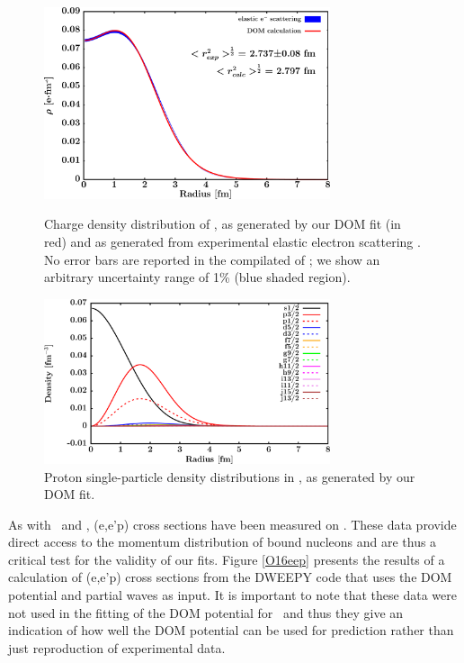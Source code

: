 \begin{figure}[tb]
    \centering
    \includegraphics[width=0.75\textwidth]{figures/o16_chargeDensity.png}
    \caption[Proton single-particle density distributions in \oSix]
    {
        Charge density distribution of \oSix, as generated
        by our DOM fit (in red) and as generated from experimental
        elastic electron scattering \cite{DeVries1987}. No error bars are
        reported in the compilated of \cite{DeVries1987}; we show an
        arbitrary uncertainty range of 1\% (blue shaded region).
    }
    \label{o16ChargeDensity}
    \vspace{16pt}
    \includegraphics[width=0.75\textwidth]{figures/o16_protonLJDensityDist.png}
    \caption[Proton single-particle density distributions in \oSix]
    {
        Proton single-particle density distributions in \oSix, as generated
        by our DOM fit.
    }
    \label{o16LJDensityDist}
\end{figure}

As with \caForty\ and \pbEight, (e,e'p) cross sections have been measured on \oSix. These data
provide direct access to the momentum distribution of bound nucleons and are thus a critical test
for the validity of our fits. Figure \ref{O16eep} presents the results of a calculation of (e,e'p)
cross sections from the DWEEPY code \cite{Atkinson2018, Giusti2011} that uses the DOM potential and partial waves as input.
It is important to note that these data were not used in the fitting of the DOM
potential for \oSix\ and thus they give an indication of how well
the DOM potential can be used for prediction rather than just reproduction of experimental data.

